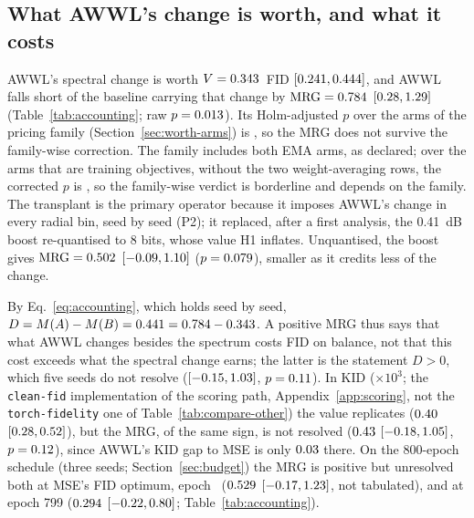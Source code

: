 
\subsection{What AWWL's change is worth, and what it costs}
\label{sec:worth-headline}

AWWL's spectral change is worth $V = 0.343$~FID
$[0.241, 0.444]$, and AWWL falls short of
the baseline carrying that change by $\mathrm{MRG} = 0.784$
$[0.28, 1.29]$ (Table~\ref{tab:accounting}; raw $p = 0.013$).
Its Holm-adjusted $p$ over the \nFamilyPricing{} arms of the pricing family
(Section~\ref{sec:worth-arms}) is \mrgArmAWWLHolm, so the MRG does not
survive the family-wise correction. The family includes both EMA arms, as
declared; over the \nFamilyPricingObjectives{} arms that are training objectives, without
the two weight-averaging rows, the corrected $p$ is \mrgArmAWWLHolmNoEMA, so the
family-wise verdict is borderline and depends on the family.
The transplant is the primary operator because it imposes AWWL's change in
every radial bin, seed by seed (P2); it replaced, after a first analysis,
the 0.41~dB boost re-quantised to 8 bits, whose value H1 inflates.
Unquantised, the boost gives $\mathrm{MRG} = 0.502$ $[-0.09, 1.10]$
($p = 0.079$), smaller as it credits less of the change.

By Eq.~\eqref{eq:accounting}, which holds seed by seed,
$D = M(A) - M(B) = 0.441 = 0.784 - 0.343$. A positive MRG
thus says that what AWWL changes besides the spectrum costs FID on balance,
not that this cost exceeds what the spectral change earns; the latter is the
statement $D > 0$, which five seeds do not resolve ($[-0.15, 1.03]$,
$p = 0.11$). In KID ($\times 10^{3}$; the \texttt{clean-fid}
implementation of the scoring path, Appendix~\ref{app:scoring}, not the
\texttt{torch-fidelity} one of Table~\ref{tab:compare-other}) the value
replicates ($0.40$ $[0.28, 0.52]$), but
the MRG, of the same sign, is not resolved ($0.43$
$[-0.18, 1.05]$, $p = 0.12$), since AWWL's KID gap to
MSE is only $0.03$ there. On the 800-epoch schedule (three seeds;
Section~\ref{sec:budget}) the MRG is positive but unresolved both at MSE's
FID optimum, epoch~\longBestEpochMSE{} ($0.529$
$[-0.17, 1.23]$, not tabulated), and at epoch 799
($0.294$ $[-0.22, 0.80]$; Table~\ref{tab:accounting}).


